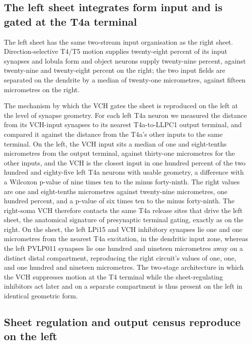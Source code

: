 \documentclass[11pt]{article}
\begin{document}
\subsection{The left sheet integrates form input and is gated at the T4a terminal}

The left sheet has the same two-stream input organisation as the right sheet. Direction-selective
T4/T5 motion supplies twenty-eight percent of its input synapses and lobula form and object
neurons supply twenty-nine percent, against twenty-nine and twenty-eight percent on the right;
the two input fields are separated on the dendrite by a median of twenty-one micrometres, against
fifteen micrometres on the right.

The mechanism by which the VCH gates the sheet is reproduced on the left at the level of synapse
geometry. For each left T4a neuron we measured the distance from its VCH-input synapses to its
nearest T4a-to-LLPC1 output terminal, and compared it against the distance from the T4a's other
inputs to the same terminal. On the left, the VCH input sits a median of one and eight-tenths
micrometres from the output terminal, against thirty-one micrometres for the other inputs, and
the VCH is the closest input in one hundred percent of the two hundred and eighty-five left T4a
neurons with usable geometry, a difference with a Wilcoxon p-value of nine times ten to the
minus forty-ninth. The right values are one and eight-tenths micrometres against twenty-nine
micrometres, one hundred percent, and a p-value of six times ten to the minus forty-ninth. The
right-soma VCH therefore contacts the same T4a release sites that drive the left sheet, the
anatomical signature of presynaptic terminal gating, exactly as on the right. On the sheet, the
left LPi15 and VCH inhibitory synapses lie one and one micrometres from the nearest T4a
excitation, in the dendritic input zone, whereas the left PVLP011 synapses lie one hundred and
nineteen micrometres away on a distinct distal compartment, reproducing the right circuit's
values of one, one, and one hundred and nineteen micrometres. The two-stage architecture in which
the VCH suppresses motion at the T4 terminal while the sheet-regulating inhibitors act later and
on a separate compartment is thus present on the left in identical geometric form.

\subsection{Sheet regulation and output census reproduce on the left}
\end{document}
